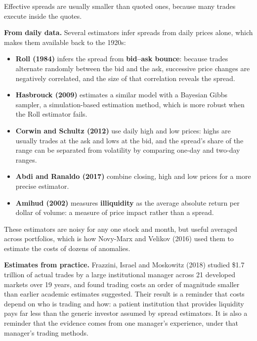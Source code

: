 Effective spreads are usually smaller than quoted ones, because many trades execute inside the quotes.

\textbf{From daily data.} Several estimators infer spreads from daily prices alone, which makes them available back to the 1920s:

\begin{itemize}
  \item \textbf{Roll (1984)} infers the spread from \textbf{bid--ask bounce}: because trades alternate randomly between the bid and the ask, successive price changes are negatively correlated, and the size of that correlation reveals the spread.
  \item \textbf{Hasbrouck (2009)} estimates a similar model with a Bayesian Gibbs sampler, a simulation-based estimation method, which is more robust when the Roll estimator fails.
  \item \textbf{Corwin and Schultz (2012)} use daily high and low prices: highs are usually trades at the ask and lows at the bid, and the spread's share of the range can be separated from volatility by comparing one-day and two-day ranges.
  \item \textbf{Abdi and Ranaldo (2017)} combine closing, high and low prices for a more precise estimator.
  \item \textbf{Amihud (2002)} measures \textbf{illiquidity} as the average absolute return per dollar of volume: a measure of price impact rather than a spread.
\end{itemize}

These estimators are noisy for any one stock and month, but useful averaged across portfolios, which is how Novy-Marx and Velikov (2016) used them to estimate the costs of dozens of anomalies.

\textbf{Estimates from practice.} Frazzini, Israel and Moskowitz (2018) studied \$1.7 trillion of actual trades by a large institutional manager across 21 developed markets over 19 years, and found trading costs an order of magnitude smaller than earlier academic estimates suggested. Their result is a reminder that costs depend on who is trading and how: a patient institution that provides liquidity pays far less than the generic investor assumed by spread estimators. It is also a reminder that the evidence comes from one manager's experience, under that manager's trading methods.

